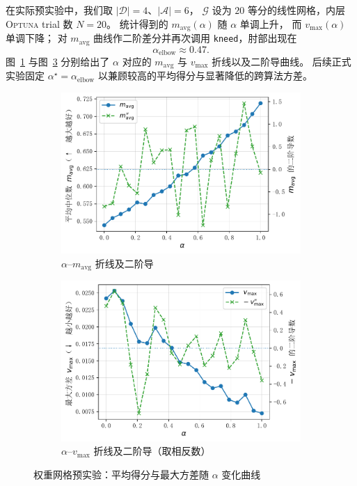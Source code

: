 \documentclass[10pt]{article} %
\numberwithin{equation}{section}
\begin{document}
\textcolor[rgb]{0.00,0.07,1.00}{在实际预实验中，我们取 $|\mathcal{D}|=4$、$|\mathcal{A}|=6$，
$\mathcal{G}$ 设为 $20$ 等分的线性网格，内层
\textsc{Optuna} trial 数 $N=20$。
统计得到的
$m_{\mathrm{avg}}(\alpha)$ 随 $\alpha$ 单调上升，
而 $v_{\max}(\alpha)$ 单调下降；
对 $m_{\mathrm{avg}}$ 曲线作二阶差分并再次调用
\texttt{kneed}，肘部出现在
\[
\boxed{\alpha_{\text{elbow}}\approx0.47}.
\]
图~\ref{fig:alpha-vs-median} 与图~\ref{fig:alpha-vs-var}
分别给出了 $\alpha$ 对应的 $m_{\mathrm{avg}}$ 与 $v_{\max}$ 折线以及二阶导曲线。
后续正式实验固定
$\alpha^\star=\alpha_{\text{elbow}}$
以兼顾较高的平均得分与显著降低的跨算法方差。}

\begin{figure}[t]
  \centering
  \begin{subfigure}{0.49\linewidth}
    \centering
    \includegraphics[width=\linewidth]{figures/4graph/alpha_vs_median.pdf}
    \caption{$\alpha$–$m_{\mathrm{avg}}$ 折线及二阶导}
    \label{fig:alpha-vs-median}
  \end{subfigure}\hfill
  \begin{subfigure}{0.49\linewidth}
    \centering
    \includegraphics[width=\linewidth]{figures/4graph/alpha_vs_variance.pdf}
    \caption{$\alpha$–$v_{\max}$ 折线及二阶导（取相反数）}
    \label{fig:alpha-vs-var}
  \end{subfigure}
  \caption{权重网格预实验：平均得分与最大方差随 $\alpha$ 变化曲线}
\end{figure}
\end{document}
